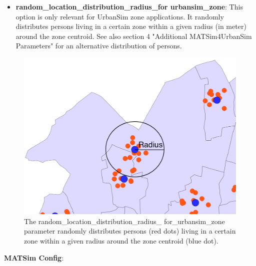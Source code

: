 \begin{itemize}
	\item \textbf{random\_location\_distribution\_radius\_for urbansim\_zone}:  This option is only relevant for UrbanSim zone applications. It  randomly distributes persons living in a certain zone within a given  radius (in meter) around the zone centroid. See also section 4  "Additional MATSim4UrbanSim Parameters" for an alternative distribution  of persons.
\end{itemize}

\begin{figure}[htp]
\includegraphics[width=\textwidth]{figures/matsim4urbansim/radius.png}
\caption{The random\_location\_distribution\_radius\_ for\_urbansim\_zone  parameter randomly distributes persons (red dots) living in a certain  zone within a given radius around the zone centroid (blue dot).}
\end{figure}


\textbf{MATSim Config}:

